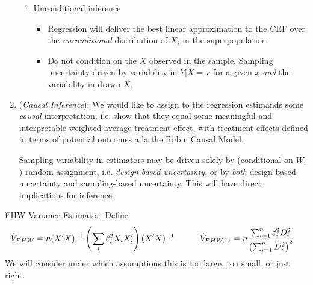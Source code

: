 \documentclass[12pt]{article}
\theoremstyle{plain}
\theoremstyle{definition}
\theoremstyle{remark}
\DeclareMathOperator*{\argmin}{arg\;min}
\newcommand{\sumin}{\sum^n_{i=1}}
\begin{document}
\begin{enumerate}
\begin{enumerate}[label=(\alph*)]
      \item Unconditional inference
        \begin{itemize}
          \item Regression will deliver the best linear approximation to
            the CEF over the \emph{unconditional} distribution of $X_i$
            in the superpopulation.
          \item Do not condition on the $X$ observed in the
            sample.
            Sampling uncertainty driven by variability in $Y|X=x$
            for a given $x$ \emph{and} the variability in drawn $X$.
        \end{itemize}
    \end{enumerate}

  \item
    (\emph{Causal Inference}):
    We would like to assign to the regression estimands some
    \emph{causal} interpretation, i.e. show that they equal some
    meaningful and interpretable weighted average treatment effect, with
    treatment effects defined in terms of potential outcomes a la the
    Rubin Causal Model.

    Sampling variability in estimators may be driven solely by
    (conditional-on-$W_i$) random assignment, i.e.
    \emph{design-based uncertainty}, or by \emph{both} design-based
    uncertainty and sampling-based uncertainty.
    This will have direct implications for inference.
\end{enumerate}
EHW Variance Estimator:
Define
\begin{align*}
  \hat{V}_{EHW}
  &=
  n(X'X)^{-1}
  \left(
  \sum_i \hat{\varepsilon}^2_i X_iX_i'
  \right)
  (X'X)^{-1}
  \qquad
  \quad
  \hat{V}_{EHW,11}
  =
  n
  \frac{%
    \sumin \hat{\varepsilon}_i^2 \tilde{D}_i^2
  }{%
    \left(\sumin \tilde{D}_i^2\right)^2
  }
\end{align*}
We will consider under which assumptions this is too large, too small,
or just right.



\clearpage
\end{document}

